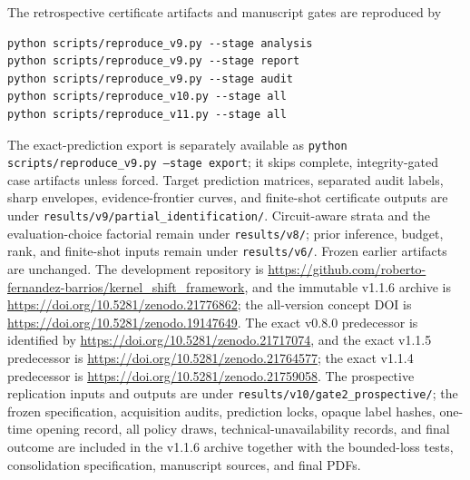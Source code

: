 \documentclass[11pt]{article}
\begin{document}
The retrospective certificate artifacts and manuscript gates are reproduced by
\begin{verbatim}
python scripts/reproduce_v9.py --stage analysis
python scripts/reproduce_v9.py --stage report
python scripts/reproduce_v9.py --stage audit
python scripts/reproduce_v10.py --stage all
python scripts/reproduce_v11.py --stage all
\end{verbatim}
The exact-prediction export is separately available as
\texttt{python scripts/reproduce\_v9.py --stage export}; it skips complete,
integrity-gated case artifacts unless forced. Target prediction matrices,
separated audit labels, sharp envelopes, evidence-frontier curves, and
finite-shot certificate outputs are under
\texttt{results/v9/partial\_identification/}. Circuit-aware strata and the
evaluation-choice factorial remain under \texttt{results/v8/}; prior inference,
budget, rank, and finite-shot inputs remain under \texttt{results/v6/}.
Frozen earlier artifacts are unchanged. The development repository is
\url{https://github.com/roberto-fernandez-barrios/kernel_shift_framework},
and the immutable v1.1.6 archive is
\url{https://doi.org/10.5281/zenodo.21776862}; the all-version concept DOI is
\url{https://doi.org/10.5281/zenodo.19147649}. The exact v0.8.0 predecessor is
identified by \url{https://doi.org/10.5281/zenodo.21717074}, and the exact
v1.1.5 predecessor is \url{https://doi.org/10.5281/zenodo.21764577}; the exact
v1.1.4 predecessor is \url{https://doi.org/10.5281/zenodo.21759058}. The
prospective replication inputs and outputs are under
\texttt{results/v10/gate2\_prospective/}; the frozen specification,
acquisition audits, prediction locks, opaque label hashes, one-time opening
record, all policy draws, technical-unavailability records, and final outcome
are included in the v1.1.6 archive together with the bounded-loss tests,
consolidation specification, manuscript sources, and final PDFs.
\end{document}

